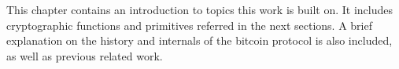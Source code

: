 \begin{mychapterabstract}
        This chapter contains an introduction to topics this work is built
        on.
        It includes cryptographic functions and primitives referred in the
        next sections.
        A brief explanation on the history and internals of the bitcoin
        protocol is also included, as well as previous related work.
\end{mychapterabstract}
